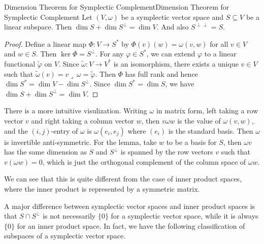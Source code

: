 \documentclass[../main.tex]{subfiles}
\begin{document}
\begin{lemma}{Dimension Theorem for Symplectic Complement}{Dimension Theorem for Symplectic Complement}
  Let $(V, \omega)$ be a symplectic vector space and $S \subseteq V$ be a linear subspace. Then $\dim S + \dim S^\perp = \dim V$. And also $S^{\perp\perp} = S$.
\end{lemma}
\begin{proof}
  Define a linear map $\Phi: V \to S^*$ by $\Phi(v)(w) = \omega(v, w)$ for all $v\in V$ and $w\in S$. Then $\ker \Phi = S^\perp$. For any $\varphi \in S^*$, we can extend $\varphi$ to a linear functional $\tilde{\varphi}$ on $V$. Since $\tilde{\omega}: V \to V^*$ is an isomorphism, there exists a unique $v\in V$ such that $\tilde{\omega}(v) = v \lrcorner \, \omega = \tilde{\varphi}$. Then $\Phi$ has full rank and hence $\dim S^* = \dim V - \dim S^\perp$. Since $\dim S^* = \dim S$, we have $\dim S + \dim S^\perp = \dim V$.
\end{proof}

\begin{remark}
  There is a more intuitive visulization. Writing $\omega$ in matrix form, left taking a row vector $v$ and right taking a column vector $w$, then $v\omega w$ is the value of $\omega(v, w)$, and the $(i,j)$-entry of $\omega$ is $\omega(e_i, e_j)$ where $(e_i)$ is the standard basis. Then $\omega$ is invertible anti-symmetric. For the lemma, take $w$ to be a basis for $S$, then $\omega v$ has the same dimension as $S$ and $S^\perp$ is spanned by the row vectors $v$ such that $v (\omega w) = 0$, which is just the orthogonal complement of the column space of $\omega w$.

  We can see that this is quite different from the case of inner product spaces, where the inner product is represented by a symmetric matrix.
\end{remark}

A major difference between symplectic vector spaces and inner product spaces is that $S \cap S^\perp$ is not necessarily $\{0\}$ for a symplectic vector space, while it is always $\{0\}$ for an inner product space. In fact, we have the following classification of subspaces of a symplectic vector space.
\end{document}
